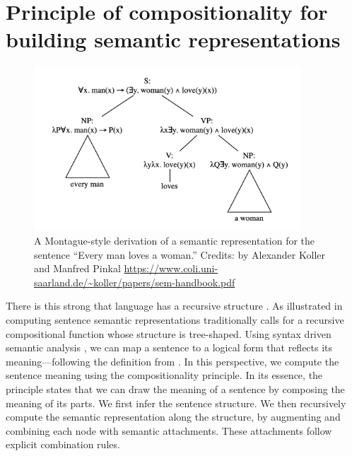 
\section{Principle of compositionality for building semantic representations}

\begin{figure}[htb!]
	\includegraphics[width=10cm]{images/lambda_form.png}
	\caption[Lambda form]{A Montague-style \parencite{montague_1973} derivation of a semantic representation for the sentence “Every man loves a woman.” Credits: by Alexander Koller and Manfred Pinkal \url{https://www.coli.uni-saarland.de/~koller/papers/sem-handbook.pdf}}
\end{figure}

There is this strong   that language has a recursive structure \parencite{chomsky_56, shen_19}. As illustrated in  computing sentence semantic representations traditionally calls for a recursive compositional function whose structure is tree-shaped. Using syntax driven semantic analysis \parencite{jurafsky_2009}, we can map a sentence to a logical form that reflects its meaning—following the definition from . In this perspective,  we compute the sentence meaning using the compositionality principle. In its essence, the principle states that we can draw the meaning of a sentence by composing the meaning of its parts.  We first infer the sentence structure. We then recursively compute the semantic representation along the structure, by  augmenting and combining each node with semantic attachments. These attachments follow explicit combination rules.

